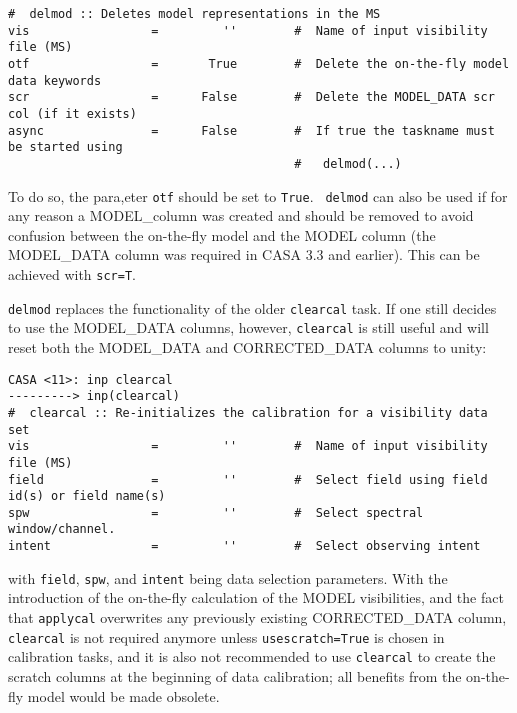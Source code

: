 \small
\begin{verbatim}
#  delmod :: Deletes model representations in the MS
vis                 =         ''        #  Name of input visibility file (MS)
otf                 =       True        #  Delete the on-the-fly model data keywords
scr                 =      False        #  Delete the MODEL_DATA scr col (if it exists)
async               =      False        #  If true the taskname must be started using
                                        #   delmod(...)
\end{verbatim} 

To do so, the para,eter {\tt otf} should be set to {\tt True}. {\tt
  delmod} can also be used if for any reason a MODEL\_column was
created and should be removed to avoid confusion between the
on-the-fly model and the MODEL column (the MODEL\_DATA column was
required in CASA 3.3 and earlier). This can be achieved with {\tt scr=T}.


{\tt delmod} replaces the functionality of the older {\tt clearcal}
task. If one still decides to use the MODEL\_DATA columns, however,
{\tt clearcal} is still useful and will reset both the MODEL\_DATA and
CORRECTED\_DATA columns to unity:

\small
\begin{verbatim}
CASA <11>: inp clearcal
---------> inp(clearcal)
#  clearcal :: Re-initializes the calibration for a visibility data set
vis                 =         ''        #  Name of input visibility file (MS)
field               =         ''        #  Select field using field id(s) or field name(s)
spw                 =         ''        #  Select spectral window/channel.
intent              =         ''        #  Select observing intent

\end{verbatim}
\normalsize

with {\tt field}, {\tt spw}, and {\tt intent} being data selection
parameters. With the introduction of the on-the-fly calculation of the
MODEL visibilities, and the fact that {\tt applycal} overwrites any
previously existing CORRECTED\_DATA column, {\tt clearcal} is not
required anymore unless {\tt usescratch=True} is chosen in calibration
tasks, and it is also not recommended to use {\tt clearcal} to create
the scratch columns at the beginning of data calibration; all benefits
from the on-the-fly model would be made obsolete.

